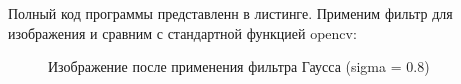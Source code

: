 \documentclass[14pt,a4paper,report]{report}
\begin{document}
Полный код программы представленн в листинге. Применим фильтр для изображения и сравним с стандартной функцией opencv:
\begin{figure}[h]
\begin{minipage}[h]{0.47\linewidth}
\end{minipage}
\hfill
\begin{minipage}[h]{0.47\linewidth}
\end{minipage}
\caption{Изображение после применения фильтра Гаусса (sigma = 0.8)}
\label{ris:image1}
\end{figure}
\clearpage
\end{document}
